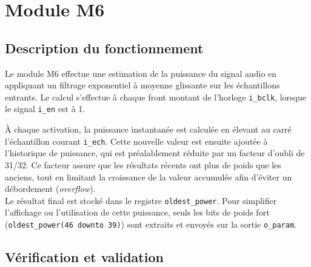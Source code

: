 \section{Module M6}



\subsection{Description du fonctionnement}




Le module M6 effectue une estimation de la puissance du signal audio en
appliquant un filtrage exponentiel à moyenne glissante sur les échantillons
entrants. Le calcul s'effectue à chaque front montant de l'horloge
\verb|i_bclk|, lorsque le signal \verb|i_en| est à 1. \\


À chaque activation, la puissance instantanée est calculée en élevant au
carré l'échantillon courant \verb|i_ech|. Cette nouvelle valeur est ensuite
ajoutée à l'historique de puissance, qui est préalablement réduite par un
facteur d'oubli de 31/32. Ce facteur assure que les résultats récents ont
plus de poids que les anciens, tout en limitant la croissance de la valeur
accumulée afin d'éviter un débordement (\emph{overflow}). \\

Le résultat final est stocké dans le registre \verb|oldest_power|. Pour
simplifier l'affichage ou l'utilisation de cette puissance, seuls les bits de
poids fort (\verb|oldest_power(46 downto 39)|) sont extraits et envoyés sur
la sortie \verb|o_param|. \\

\subsection{Vérification et validation}

